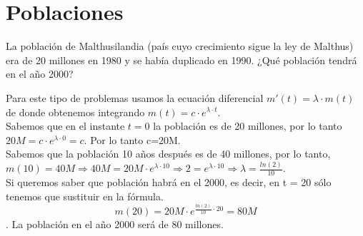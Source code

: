 
\section{Poblaciones}
\begin{ejer}
	La población de Malthusilandia (país cuyo crecimiento sigue la ley de Malthus) era de 20 millones en 1980 y se había duplicado en 1990. ¿Qué población tendrá en el año 2000?
\end{ejer}
\begin{sol}
	Para este tipo de problemas usamos la ecuación diferencial $m'(t) = \lambda \cdot m(t)$ de donde obtenemos integrando $m(t) = c\cdot e^{\lambda \cdot t}$.  \\
	Sabemos que en el instante $t=0$ la población es de 20 millones, por lo tanto $20M = c\cdot e^{\lambda \cdot 0} = c$. Por lo tanto c=20M.\\ 
	Sabemos que la población 10 años después es de 40 millones, por lo tanto, $m(10) = 40M \Rightarrow 40M = 20M \cdot e^{\lambda \cdot 10} \Rightarrow 2 = e^{\lambda \cdot 10} \Rightarrow \lambda = \frac{ln(2)}{10}$.\\
	Si queremos saber que población habrá en el 2000, es decir, en t = 20 sólo tenemos que sustituir en la fórmula.\\  
	$$m(20) = 20M\cdot e^{\frac{ln(2)}{10}\cdot 20} = 80M$$.  
	La población en el año 2000 será de 80 millones.
\end{sol}


